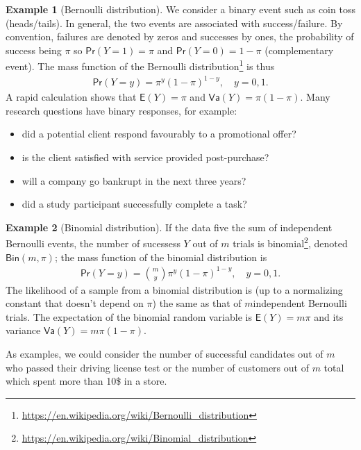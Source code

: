 \documentclass[
  11pt,
  letterpaper,
]{book}
\providecommand{\tightlist}{%
  \setlength{\itemsep}{0pt}\setlength{\parskip}{0pt}}
\renewcommand{\href}[2]{#2\footnote{\url{#1}}}
\theoremstyle{definition}
\theoremstyle{definition}
\newtheorem{example}{Example}[chapter]
\theoremstyle{definition}
\theoremstyle{definition}
\theoremstyle{remark}
\begin{document}
\begin{example}[Bernoulli distribution]
\protect\hypertarget{exm:bernoullidist}{}{\label{exm:bernoullidist} {} }We consider a binary event such as coin toss (heads/tails). In general, the two events are associated with success/failure. By convention, failures are denoted by zeros and successes by ones, the probability of success being \(\pi\) so \(\mathsf{Pr}(Y=1)=\pi\) and \(\mathsf{Pr}(Y=0)=1-\pi\) (complementary event). The mass function of the \href{https://en.wikipedia.org/wiki/Bernoulli_distribution}{Bernoulli distribution} is thus
\begin{align*}
\mathsf{Pr}(Y=y) = \pi^y (1-\pi)^{1-y}, \quad y=0, 1.
\end{align*}
A rapid calculation shows that \(\mathsf{E}(Y)=\pi\) and \(\mathsf{Va}(Y)=\pi(1-\pi)\).
Many research questions have binary responses, for example:

\begin{itemize}
\tightlist
\item
  did a potential client respond favourably to a promotional offer?
\item
  is the client satisfied with service provided post-purchase?
\item
  will a company go bankrupt in the next three years?
\item
  did a study participant successfully complete a task?
\end{itemize}
\end{example}

\begin{example}[Binomial distribution]
\protect\hypertarget{exm:binomialdist}{}{\label{exm:binomialdist} {} }If the data five the sum of independent Bernoulli events, the number of sucessess \(Y\) out of \(m\) trials is \href{https://en.wikipedia.org/wiki/Binomial_distribution}{binomial}, denoted \(\mathsf{Bin}(m, \pi)\); the mass function of the binomial distribution is
\begin{align*}
\mathsf{Pr}(Y=y) = \binom{m}{y}\pi^y (1-\pi)^{1-y}, \quad y=0, 1.
\end{align*}
The likelihood of a sample from a binomial distribution is (up to a normalizing constant that doesn't depend on \(\pi\)) the same as that of \(m\)independent Bernoulli trials. The expectation of the binomial random variable is \(\mathsf{E}(Y)=m\pi\) and its variance \(\mathsf{Va}(Y)=m\pi(1-\pi)\).

As examples, we could consider the number of successful candidates out of \(m\) who passed their driving license test or the number of customers out of \(m\) total which spent more than 10\$ in a store.
\end{example}
\end{document}
